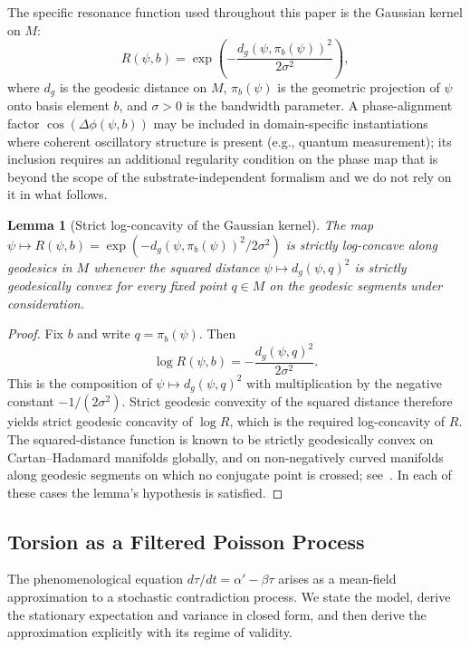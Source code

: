 \documentclass[11pt]{article}
\theoremstyle{plain}
\newtheorem{lemma}{Lemma}[section]
\begin{document}
The specific resonance function used throughout this paper is the Gaussian kernel on $M$:
\begin{equation}\label{eq:resonance}
  R(\psi, b) = \exp\!\left( -\frac{d_g(\psi, \pi_b(\psi))^2}{2\sigma^2} \right),
\end{equation}
where $d_g$ is the geodesic distance on $M$, $\pi_b(\psi)$ is the geometric projection of $\psi$
onto basis element $b$, and $\sigma > 0$ is the bandwidth parameter. A phase-alignment factor
$\cos(\Delta\phi(\psi, b))$ may be included in domain-specific instantiations where coherent
oscillatory structure is present (e.g., quantum measurement); its inclusion requires an additional
regularity condition on the phase map that is beyond the scope of the substrate-independent
formalism and we do not rely on it in what follows.

\begin{lemma}[Strict log-concavity of the Gaussian kernel]\label{lem:logconcave}
The map $\psi \mapsto R(\psi, b) = \exp(-d_g(\psi,\allowbreak \pi_b(\psi))^2 /\allowbreak 2\sigma^2)$ is strictly
log-concave along geodesics in $M$ whenever the squared distance $\psi \mapsto d_g(\psi, q)^2$ is
strictly geodesically convex for every fixed point $q \in M$ on the geodesic segments under
consideration.
\end{lemma}

\begin{proof}
Fix $b$ and write $q = \pi_b(\psi)$. Then
\[
  \log R(\psi, b) = -\frac{d_g(\psi, q)^2}{2\sigma^2}.
\]
This is the composition of $\psi \mapsto d_g(\psi, q)^2$ with multiplication by the negative
constant $-1/(2\sigma^2)$. Strict geodesic convexity of the squared distance therefore yields strict
geodesic concavity of $\log R$, which is the required log-concavity of $R$. The squared-distance
function is known to be strictly geodesically convex on Cartan--Hadamard manifolds globally, and on
non-negatively curved manifolds along geodesic segments on which no conjugate point is crossed;
see~\cite[Chapter~6]{petersen2016}. In each of these cases the lemma's hypothesis is satisfied.
\end{proof}

\subsection{Torsion as a Filtered Poisson Process}\label{sec:poisson}

The phenomenological equation $d\tau/dt = \alpha' - \beta\tau$ arises as a mean-field approximation
to a stochastic contradiction process. We state the model, derive the stationary expectation and
variance in closed form, and then derive the approximation explicitly with its regime of validity.
\end{document}
